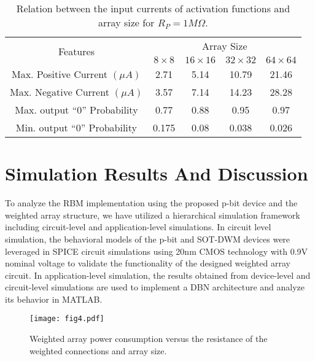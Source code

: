\begin{table}[]
\centering
\small
\caption{Relation between the input currents of activation functions and array size for $R_P = 1 M \Omega$.}
\vspace{-0.2cm}
\label{tab:arraysize}
\begin{tabular}{ccccc}
\hline
\multirow{2}{*}{Features}       & \multicolumn{4}{c}{Array Size}                                  \\ \cline{2-5} 
                                & $8 \times 8$ & $16 \times 16$ & $32 \times 32$ & $64 \times 64$ \\ \hline
Max. Positive Current $(\mu A)$ & 2.71         & 5.14           & 10.79          & 21.46          \\
Max. Negative Current $(\mu A)$ & 3.57         & 7.14           & 14.23          & 28.28          \\
Max. output ``0'' Probability   & 0.77         & 0.88           & 0.95           & 0.97           \\
Min. output ``0'' Probability   & 0.175        & 0.08           & 0.038          & 0.026          \\ \hline
\end{tabular}
\end{table}




\section{Simulation Results And Discussion}
To analyze the RBM implementation using the proposed p-bit device and the weighted array structure, we have utilized a hierarchical simulation framework including circuit-level and application-level simulations. In circuit level simulation, the behavioral models of the p-bit and SOT-DWM devices were leveraged in SPICE circuit simulations using 20nm CMOS technology with 0.9V nominal voltage to validate the functionality of the designed weighted array circuit. In application-level simulation, the results obtained from device-level and circuit-level simulations are used to implement a DBN architecture and analyze its behavior in MATLAB.


\begin{figure}
\texttt{[image: fig4.pdf]}
\caption{Weighted array power consumption versus the resistance of the weighted connections and array size.}
\vspace{-0.3cm}
\end{figure}


